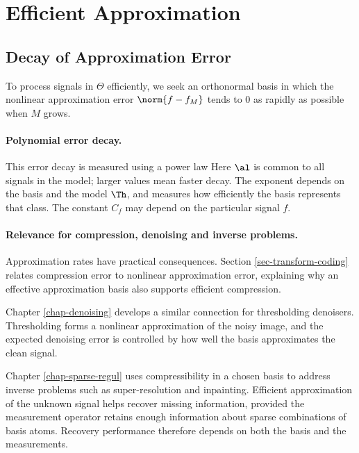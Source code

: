 \section{Efficient Approximation}

                                        
\subsection{Decay of Approximation Error}
\label{sec-linear-approx-error}

To process signals in $\Theta$ efficiently, we seek an orthonormal basis in which the nonlinear approximation error $\norm{f-f_M}$ tends to $0$ as rapidly as possible when $M$ grows.


  
\paragraph{Polynomial error decay.}

This error decay is measured using a power law
Here $\al$ is common to all signals in the model; larger values mean faster decay. The exponent depends on the basis and the model $\Th$, and measures how efficiently the basis represents that class. The constant $C_f$ may depend on the particular signal $f$.

  
\paragraph{Relevance for compression, denoising and inverse problems.}

Approximation rates have practical consequences. Section \ref{sec-transform-coding} relates compression error to nonlinear approximation error, explaining why an effective approximation basis also supports efficient compression.

Chapter \ref{chap-denoising} develops a similar connection for thresholding denoisers. Thresholding forms a nonlinear approximation of the noisy image, and the expected denoising error is controlled by how well the basis approximates the clean signal.

Chapter \ref{chap-sparse-regul} uses compressibility in a chosen basis to address inverse problems such as super-resolution and inpainting. Efficient approximation of the unknown signal helps recover missing information, provided the measurement operator retains enough information about sparse combinations of basis atoms. Recovery performance therefore depends on both the basis and the measurements.



